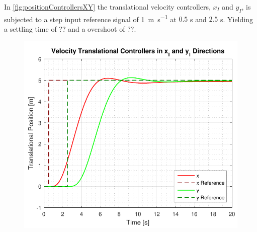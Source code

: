 \begin{minipage}{\linewidth}
\begin{minipage}{0.5\linewidth}
\begin{figure}[H]
            \centering
            \label{fig:velocityControllersXYAction}
        \end{figure}
    \end{minipage}
\end{minipage}

In \autoref{fig:positionControllersXY} the translational velocity controllers, $x_I$ and $y_I$, is subjected to a step input reference signal of \SI{1}{m s^{-1}} at $0.5$ \si{s} and $2.5$ \si{s}. Yielding a settling time of ?? and a overshoot of ??.

\begin{minipage}{\linewidth}
    \begin{minipage}{0.46\linewidth}
        \begin{figure}[H]
            \includegraphics[scale=.61]{figures/positionControllersXY}
            \centering			
            \label{fig:positionControllersXY}
        \end{figure}
    \end{minipage}
    \hspace{0.03\linewidth}

\end{minipage}
